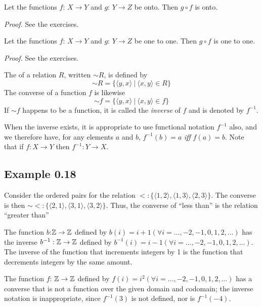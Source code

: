 \begin{thm}\label{thm-0.1}
Let the functions $f$: $X\rightarrow Y$ and $g$: $Y\rightarrow Z$ be onto. Then
$g\circ f$ is onto.

\emph{Proof.} See the exercises.
\end{thm}

\begin{thm}\label{thm-0.2}
Let the functions $f$: $X\rightarrow Y$ and $g$: $Y\rightarrow Z$ be one to one.
Then $g\circ f$ is one to one.

\emph{Proof.} See the exercises.
\end{thm}

\begin{dfn}\label{dfn-0.18}
The \emph{} of a relation $R$, written $\sim  R$, is defined by
\[\sim  R = \{\langle y,x\rangle \ |\  \langle x,y\rangle \in R\}\]
The converse of a function $f$ is likewise
\[\sim   f = \{\langle y,x\rangle \ |\  \langle x,y\rangle \in f\}\]
If $\sim   f$ happens to be a function, it is called the \emph{inverse} of $f$ and
is denoted by $f^{-1}$.
\end{dfn}

When the inverse exists, it is appropriate to use functional notation $f^{-1}$
also, and we therefore have, for any elements $a$ and $b$, $f^{-1}(b) = a$
\emph{iff} $f(a) = b$. Note that if $f: X \rightarrow Y$ then
$f^{-1}: Y \rightarrow X$.

\subsection*{Example 0.18}

Consider the ordered pairs for the relation
$<: \{\langle 1,2\rangle,\langle 1,3\rangle,\langle 2,3\rangle\}$. The converse
is then $\sim <: \{\langle 2,1\rangle,\langle 3,1\rangle,\langle 3,2\rangle \}$.
Thus, the converse of ``less than'' is the relation ``greater than''

The function $b$:$\mathbb{Z} \rightarrow \mathbb{Z}$ defined by
$b(i) = i + 1 (\forall i = \ldots,-2, -1,0,1,2, \ldots)$ has the inverse
$b^{-1}: \mathbb{Z} \rightarrow \mathbb{Z}$ defined by
$b^{-1}(i) = i - 1 (\forall i = \ldots,-2,-1,0,1,2,\ldots)$. The inverse of the
function that increments integers by 1 is the function that decrements integers
by the same amount.

The function $f$: $\mathbb{Z} \rightarrow \mathbb{Z}$ defined by
$f(i) = i^2 (\forall i = \ldots,-2,-1,0,1,2,\ldots)$ has a converse that is not
a function over the given domain and codomain; the inverse notation is
inappropriate, since $f^{-1}(3)$ is not defined, nor is $f^{-1}(-4)$.

